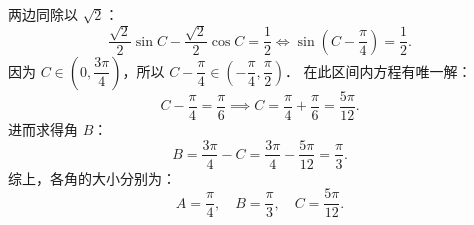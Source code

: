 \begin{answer}
\[\]
  两边同除以 $\sqrt{2}$：
\nopagebreak[4]
\[
\frac{\sqrt{2}}{2}\sin C - \frac{\sqrt{2}}{2}\cos C = \frac{1}{2} \iff \sin\left(C - \frac{\pi}{4}\right) = \frac{1}{2}.
\]
  因为 $C \in \left(0, \dfrac{3\pi}{4}\right)$，所以 $C - \dfrac{\pi}{4} \in \left(-\dfrac{\pi}{4}, \dfrac{\pi}{2}\right)$．
  在此区间内方程有唯一解：
\nopagebreak[4]
\[
C - \frac{\pi}{4} = \frac{\pi}{6} \implies C = \frac{\pi}{4} + \frac{\pi}{6} = \frac{5\pi}{12}.
\]
进而求得角 $B$：
\nopagebreak[4]
\[
B = \frac{3\pi}{4} - C = \frac{3\pi}{4} - \frac{5\pi}{12} = \frac{\pi}{3}.
\]
综上，各角的大小分别为：
\nopagebreak[4]
\[
A = \frac{\pi}{4}, \quad B = \frac{\pi}{3}, \quad C = \frac{5\pi}{12}.
\]


\end{answer}
